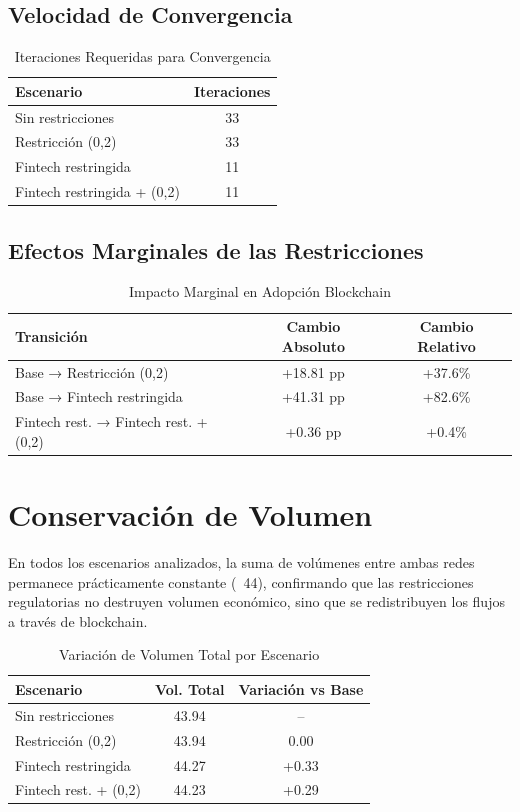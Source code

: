 \documentclass[12pt]{article}
\begin{document}
\subsection{Velocidad de Convergencia}

\begin{table}[H]
\centering
\caption{Iteraciones Requeridas para Convergencia}
\begin{tabular}{lc}
\toprule
\textbf{Escenario} & \textbf{Iteraciones} \\
\midrule
Sin restricciones & 33 \\
Restricción (0,2) & 33 \\
Fintech restringida & 11 \\
Fintech restringida + (0,2) & 11 \\
\bottomrule
\end{tabular}
\end{table}

\subsection{Efectos Marginales de las Restricciones}

\begin{table}[H]
\centering
\caption{Impacto Marginal en Adopción Blockchain}
\begin{tabular}{lcc}
\toprule
\textbf{Transición} & \textbf{Cambio Absoluto} & \textbf{Cambio Relativo} \\
\midrule
Base → Restricción (0,2) & +18.81 pp & +37.6\% \\
Base → Fintech restringida & +41.31 pp & +82.6\% \\
Fintech rest. → Fintech rest. + (0,2) & +0.36 pp & +0.4\% \\
\bottomrule
\end{tabular}
\label{tab:efectos-marginales}
\end{table}

\section{Conservación de Volumen}

En todos los escenarios analizados, la suma de volúmenes entre ambas redes permanece prácticamente constante (~44), confirmando que las restricciones regulatorias no destruyen volumen económico, sino que se redistribuyen los flujos a través de blockchain.

\begin{table}[H]
\centering
\caption{Variación de Volumen Total por Escenario}
\begin{tabular}{lcc}
\toprule
\textbf{Escenario} & \textbf{Vol. Total} & \textbf{Variación vs Base} \\
\midrule
Sin restricciones & 43.94 & -- \\
Restricción (0,2) & 43.94 & 0.00 \\
Fintech restringida & 44.27 & +0.33 \\
Fintech rest. + (0,2) & 44.23 & +0.29 \\
\bottomrule
\end{tabular}
\end{table}
\end{document}
